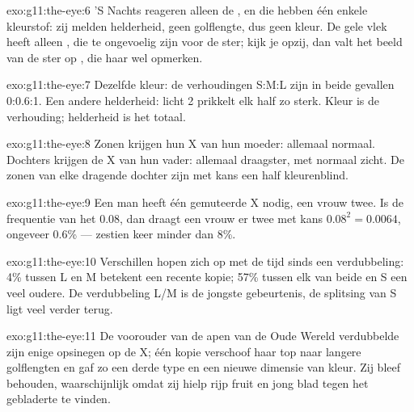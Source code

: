 \begin{solution}{exo:g11:the-eye:6}
'S Nachts reageren alleen de , en die hebben één enkele
kleurstof: zij melden helderheid, geen golflengte, dus geen kleur. De
gele vlek heeft alleen , die te ongevoelig zijn voor de ster;
kijk je opzij, dan valt het beeld van de ster op , die haar wel
opmerken.
\end{solution}

\begin{solution}{exo:g11:the-eye:7}
Dezelfde kleur: de verhoudingen S:M:L zijn in beide gevallen 0:0.6:1. Een
andere helderheid: licht 2 prikkelt elk  half zo sterk. Kleur is
de verhouding; helderheid is het totaal.
\end{solution}

\begin{solution}{exo:g11:the-eye:8}
Zonen krijgen hun X van hun moeder: allemaal normaal. Dochters krijgen de
X van hun vader: allemaal draagster, met normaal zicht. De zonen van elke
dragende dochter zijn met kans een half kleurenblind.
\end{solution}

\begin{solution}{exo:g11:the-eye:9}
Een man heeft één gemuteerde X nodig, een vrouw twee. Is de frequentie
van het  0.08, dan draagt een vrouw er twee met kans
$0.08^2 = 0.0064$, ongeveer 0.6\% --- zestien keer minder dan 8\%.
\end{solution}

\begin{solution}{exo:g11:the-eye:10}
Verschillen hopen zich op met de tijd sinds een verdubbeling: 4\% tussen
L en M betekent een recente kopie; 57\% tussen elk van beide en S een veel
oudere. De verdubbeling L/M is de jongste gebeurtenis, de splitsing van S
ligt veel verder terug.
\end{solution}

\begin{solution}{exo:g11:the-eye:11}
De voorouder van de apen van de Oude Wereld verdubbelde zijn enige
opsinegen op de X; één kopie verschoof haar top naar langere golflengten
en gaf zo een derde type  en een nieuwe dimensie van kleur. Zij
bleef behouden, waarschijnlijk omdat zij hielp rijp fruit en jong blad
tegen het gebladerte te vinden.
\end{solution}

